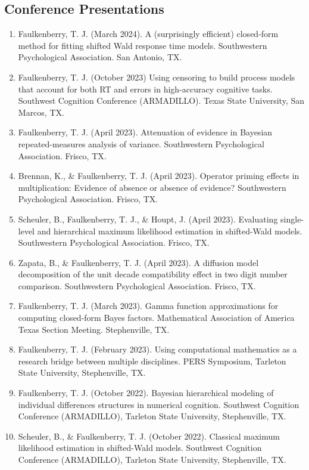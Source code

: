 \documentclass[article,10pt]{article}
\begin{document}
\subsection*{Conference Presentations}
\label{sec:org527020d}
\begin{enumerate}
\item Faulkenberry, T. J. (March 2024). A (surprisingly efficient) closed-form method for fitting shifted Wald response time models. Southwestern Psychological Association. San Antonio, TX.
\item Faulkenberry, T. J. (October 2023) Using censoring to build process models that account for both RT and errors in high-accuracy cognitive tasks. Southwest Cognition Conference (ARMADILLO). Texas State University, San Marcos, TX.
\item Faulkenberry, T. J. (April 2023). Attenuation of evidence in Bayesian repeated-measures analysis of variance. Southwestern Psychological Association. Frisco, TX.
\item Brennan, K., \& Faulkenberry, T. J. (April 2023). Operator priming effects in multiplication: Evidence of absence or absence of evidence? Southwestern Psychological Association. Frisco, TX.
\item Scheuler, B., Faulkenberry, T. J., \& Houpt, J. (April 2023). Evaluating single-level and hierarchical maximum likelihood estimation in shifted-Wald models. Southwestern Psychological Association. Frisco, TX.
\item Zapata, B., \& Faulkenberry, T. J. (April 2023). A diffusion model decomposition of the unit decade compatibility effect in two digit number comparison. Southwestern Psychological Association. Frisco, TX.
\item Faulkenberry, T. J. (March 2023). Gamma function approximations for computing closed-form Bayes factors. Mathematical Association of America Texas Section Meeting. Stephenville, TX.
\item Faulkenberry, T. J. (February 2023). Using computational mathematics as a research bridge between multiple disciplines. PERS Symposium, Tarleton State University, Stephenville, TX.
\item Faulkenberry, T. J. (October 2022). Bayesian hierarchical modeling of individual differences structures in numerical cognition. Southwest Cognition Conference (ARMADILLO), Tarleton State University, Stephenville, TX.
\item Scheuler, B., \& Faulkenberry, T. J. (October 2022). Classical maximum likelihood estimation in shifted-Wald models. Southwest Cognition Conference (ARMADILLO), Tarleton State University, Stephenville, TX.

\end{enumerate}
\end{document}
